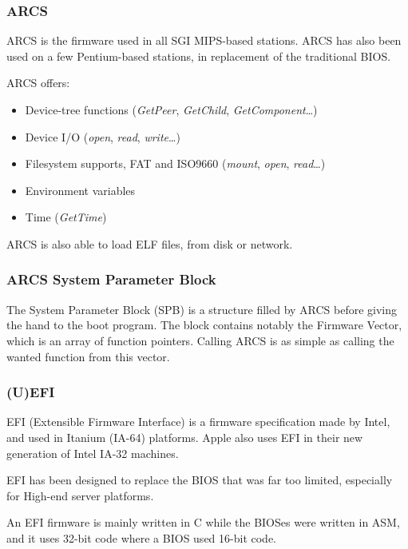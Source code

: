\begin{frame}
  \frametitle{ARCS}

  ARCS is the firmware used in all SGI MIPS-based stations. ARCS has
  also been used on a few Pentium-based stations, in replacement of
  the traditional BIOS.

  \-

  ARCS offers:

  \begin{itemize}
  \item
    Device-tree functions (\emph{GetPeer}, \emph{GetChild},
    \emph{GetComponent}\ldots)
  \item
    Device I/O (\emph{open}, \emph{read}, \emph{write}\ldots)
  \item
    Filesystem supports, FAT and ISO9660 (\emph{mount}, \emph{open},
    \emph{read}\ldots)
  \item
    Environment variables
  \item
    Time (\emph{GetTime})
  \end{itemize}

  \-

  ARCS is also able to load ELF files, from disk or network.

\end{frame}

\begin{frame}
  \frametitle{ARCS System Parameter Block}

  The System Parameter Block (SPB) is a structure filled by ARCS before giving the 
  hand to the boot program. The block contains notably the Firmware Vector, which is 
  an array of function pointers. Calling ARCS is as simple as calling the wanted function 
  from this vector. 

\end{frame}


\begin{frame}
  \frametitle{(U)EFI}

  EFI (Extensible Firmware Interface) is a firmware specification made by Intel, and used in Itanium (IA-64) platforms. Apple also uses EFI in their new generation of Intel IA-32 machines.

  \-

  EFI has been designed to replace the BIOS that was far too limited, especially for High-end server platforms.

  \-

  An EFI firmware is mainly written in C while the BIOSes were written in ASM, and it uses 32-bit code where a BIOS used 16-bit code.

\end{frame}

